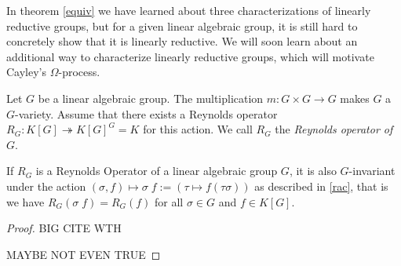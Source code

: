 In theorem \ref{equiv} we have learned about three characterizations of linearly reductive groups, but for a given linear algebraic group, it is still hard to concretely show that it is linearly reductive.
We will soon learn about an additional way to characterize linearly reductive groups, which will motivate Cayley's $\Omega$-process.

\begin{definition}
  Let $G$ be a linear algebraic group.
  The multiplication $m \colon G\times G \longrightarrow G$ makes $G$ a $G$-variety.
  Assume that there exists a Reynolds operator $R_G \colon K[G] \twoheadrightarrow K[G]^G = K$ for this action.
  We call $R_G$ the \textit{Reynolds operator of $G$}.
\end{definition}

\begin{proposition}\label{rinv}
  If $R_G$ is a Reynolds Operator of a linear algebraic group $G$, it is also $G$-invariant under the action $(\sigma,f) \mapsto \sigma\dot{\phantom{.}}f := (\tau \mapsto f(\tau\sigma))$ as described in \ref{rac}, that is we have $R_G (\sigma\dot{\phantom{.}}f)=R_G(f)$ for all $\sigma \in G$ and $f \in K[G]$.
\end{proposition}

\begin{proof}
  BIG CITE WTH

  MAYBE NOT EVEN TRUE
\end{proof}

